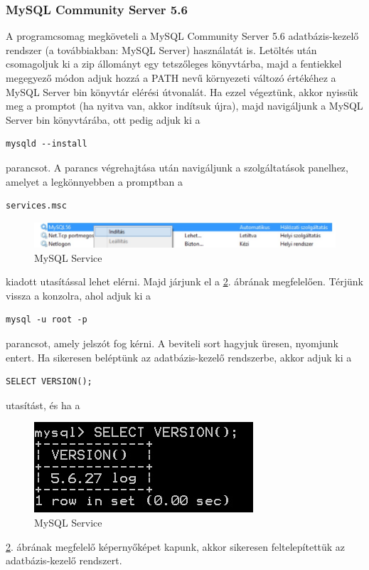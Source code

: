  \subsubsection{MySQL Community Server 5.6}
 A programcsomag megköveteli a MySQL Community Server 5.6 adatbázis-kezelő rendszer \cite{mysqlsite} (a továbbiakban: MySQL Server) használatát is. Letöltés után csomagoljuk ki a zip állományt egy tetszőleges könyvtárba, majd a fentiekkel megegyező módon adjuk hozzá a PATH nevű környezeti változó értékéhez a MySQL Server bin könyvtár elérési útvonalát. Ha ezzel végeztünk, akkor nyissük meg a promptot (ha nyitva van, akkor indítsuk újra), majd navigáljunk a MySQL Server bin könyvtárába, ott pedig adjuk ki a
 \begin{verbatim}
mysqld --install
\end{verbatim}
parancsot. A parancs végrehajtása után navigáljunk a szolgáltatások panelhez, amelyet a legkönnyebben a promptban a
 \begin{verbatim}
services.msc
\end{verbatim}
\begin{figure}[h!]
  \caption{MySQL Service}
  \label{fig:mysql_service}
  \centering
    \includegraphics{user-documentation/images/mysql_service.jpg}
\end{figure}
kiadott utasítással lehet elérni. Majd járjunk el a \ref{fig:mysql_service}. ábrának megfelelően. Térjünk vissza a konzolra, ahol adjuk ki a 
 \begin{verbatim}
mysql -u root -p
\end{verbatim}
parancsot, amely jelszót fog kérni. A beviteli sort hagyjuk üresen, nyomjunk entert. Ha sikeresen beléptünk az adatbázis-kezelő rendszerbe, akkor adjuk ki a
 \begin{verbatim}
SELECT VERSION();
\end{verbatim}
utasítást, és ha a 
\begin{figure}[h!]
  \caption{MySQL Service}
  \label{fig:mysql_service}
  \centering
    \includegraphics{user-documentation/images/mysql_version.jpg}
\end{figure}
\ref{fig:mysql_service}. ábrának megfelelő képernyőképet kapunk, akkor sikeresen feltelepítettük az adatbázis-kezelő rendszert.

